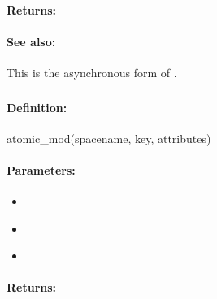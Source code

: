 \paragraph{Returns:}


\paragraph{See also:}  This is the asynchronous form of .

\pagebreak
\subsubsection{}
\label{api:ruby:atomic_mod}


\paragraph{Definition:}
\begin{rubycode}
atomic_mod(spacename, key, attributes)
\end{rubycode}

\paragraph{Parameters:}
\begin{itemize}[noitemsep]
\item {}\\

\item {}\\

\item {}\\

\end{itemize}

\paragraph{Returns:}


\pagebreak
\subsubsection{}
\label{api:ruby:async_atomic_mod}


